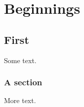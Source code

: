 \documentclass{report}
\begin{document}
\part{Beginnings}
\chapter{First}
Some text.
\section{A section}
More text.
\end{document}
